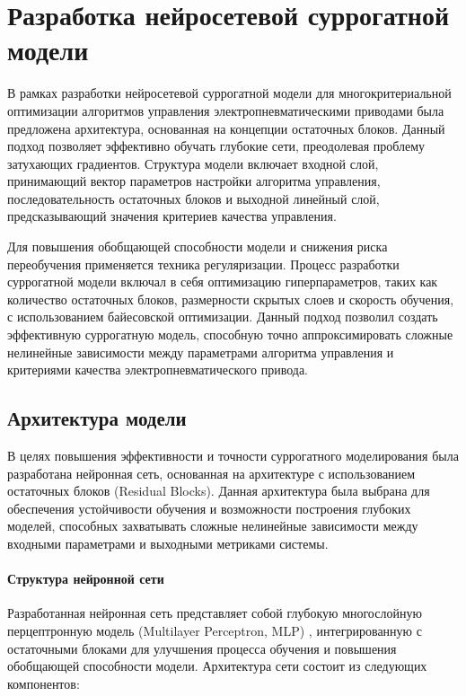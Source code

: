 \section{Разработка нейросетевой суррогатной модели}\label{sec:ch4/sec3}
В рамках разработки нейросетевой суррогатной модели для многокритериальной
оптимизации алгоритмов управления электропневматическими приводами была предложена
архитектура, основанная на концепции остаточных блоков. Данный подход позволяет
эффективно обучать глубокие сети, преодолевая проблему затухающих градиентов.
Структура модели включает входной слой, принимающий вектор параметров настройки
алгоритма управления, последовательность остаточных блоков и выходной линейный слой,
предсказывающий значения критериев качества управления.

Для повышения обобщающей способности модели и снижения
риска переобучения применяется техника регуляризации.
Процесс разработки суррогатной модели включал в себя оптимизацию
гиперпараметров, таких как количество остаточных блоков, размерности
скрытых слоев и скорость обучения, с использованием байесовской оптимизации.
Данный подход позволил создать эффективную суррогатную модель, способную
точно аппроксимировать сложные нелинейные зависимости между параметрами
алгоритма управления и критериями качества электропневматического привода.

\subsection{Архитектура модели}\label{sec:ch4/sec3/subsec1}

В целях повышения эффективности и точности суррогатного моделирования была разработана нейронная сеть,
основанная на архитектуре с использованием остаточных блоков (Residual Blocks). Данная архитектура была
выбрана для обеспечения устойчивости обучения и возможности построения глубоких моделей, способных захватывать
сложные нелинейные зависимости между входными параметрами и выходными метриками системы.

\paragraph{Структура нейронной сети}\label{sec:ch4/sec3/subsec1/subsubsec1}

Разработанная нейронная сеть представляет собой глубокую многослойную перцептронную модель (Multilayer Perceptron, MLP) \cite*{goodfellow2016deep},
интегрированную с остаточными блоками для улучшения процесса обучения и повышения обобщающей способности модели.
Архитектура сети состоит из следующих компонентов:

